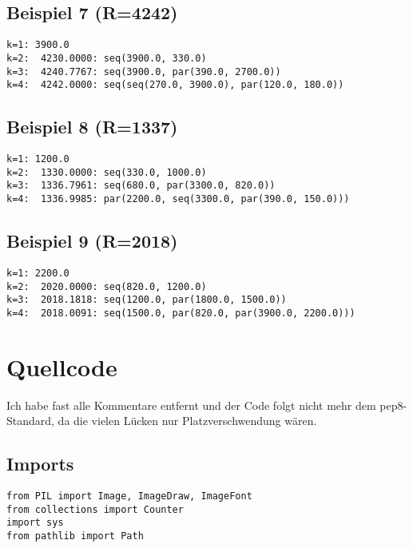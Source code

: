 \documentclass[a4paper,10pt,ngerman]{scrartcl}
\begin{document}
\subsection{Beispiel 7 (R=4242)}
\begin{verbatim}
k=1: 3900.0
k=2:  4230.0000: seq(3900.0, 330.0)
k=3:  4240.7767: seq(3900.0, par(390.0, 2700.0))
k=4:  4242.0000: seq(seq(270.0, 3900.0), par(120.0, 180.0))
\end{verbatim}
\pagebreak
\subsection{Beispiel 8 (R=1337)}
\begin{verbatim}
k=1: 1200.0
k=2:  1330.0000: seq(330.0, 1000.0)
k=3:  1336.7961: seq(680.0, par(3300.0, 820.0))
k=4:  1336.9985: par(2200.0, seq(3300.0, par(390.0, 150.0)))
\end{verbatim}
\pagebreak
\subsection{Beispiel 9 (R=2018)}
\begin{verbatim}
k=1: 2200.0
k=2:  2020.0000: seq(820.0, 1200.0)
k=3:  2018.1818: seq(1200.0, par(1800.0, 1500.0))
k=4:  2018.0091: seq(1500.0, par(820.0, par(3900.0, 2200.0)))
\end{verbatim}
\pagebreak
\section{Quellcode}
Ich habe fast alle Kommentare entfernt und der Code folgt nicht mehr
dem pep8-Standard, da die vielen L\"ucken nur Platzverschwendung w\"aren.
\lstset{language=Python}
\subsection{Imports}
\begin{lstlisting}
from PIL import Image, ImageDraw, ImageFont
from collections import Counter
import sys
from pathlib import Path
\end{lstlisting}
\end{document}
